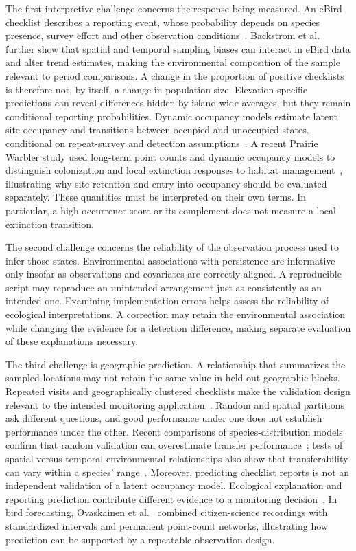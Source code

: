 The first interpretive challenge concerns the response being measured. An eBird checklist describes a reporting event, whose probability depends on species presence, survey effort and other observation conditions~\cite{sullivan2009,johnston2021}. Backstrom et al.~\cite{backstrom2025} further show that spatial and temporal sampling biases can interact in eBird data and alter trend estimates, making the environmental composition of the sample relevant to period comparisons. A change in the proportion of positive checklists is therefore not, by itself, a change in population size. Elevation-specific predictions can reveal differences hidden by island-wide averages, but they remain conditional reporting probabilities. Dynamic occupancy models estimate latent site occupancy and transitions between occupied and unoccupied states, conditional on repeat-survey and detection assumptions~\cite{mackenzie2002,mackenzie2003,guillera2017}. A recent Prairie Warbler study used long-term point counts and dynamic occupancy models to distinguish colonization and local extinction responses to habitat management~\cite{gordon2024}, illustrating why site retention and entry into occupancy should be evaluated separately. These quantities must be interpreted on their own terms. In particular, a high occurrence score or its complement does not measure a local extinction transition.

The second challenge concerns the reliability of the observation process used to infer those states. Environmental associations with persistence are informative only insofar as observations and covariates are correctly aligned. A reproducible script may reproduce an unintended arrangement just as consistently as an intended one. Examining implementation errors helps assess the reliability of ecological interpretations. A correction may retain the environmental association while changing the evidence for a detection difference, making separate evaluation of these explanations necessary.

The third challenge is geographic prediction. A relationship that summarizes the sampled locations may not retain the same value in held-out geographic blocks. Repeated visits and geographically clustered checklists make the validation design relevant to the intended monitoring application~\cite{roberts2017,valavi2019,ploton2020}. Random and spatial partitions ask different questions, and good performance under one does not establish performance under the other. Recent comparisons of species-distribution models confirm that random validation can overestimate transfer performance~\cite{spacetime2025}; tests of spatial versus temporal environmental relationships also show that transferability can vary within a species' range~\cite{lovell2025}. Moreover, predicting checklist reports is not an independent validation of a latent occupancy model. Ecological explanation and reporting prediction contribute different evidence to a monitoring decision~\cite{elith2009}. In bird forecasting, Ovaskainen et al.~\cite{ovaskainen2026} combined citizen-science recordings with standardized intervals and permanent point-count networks, illustrating how prediction can be supported by a repeatable observation design.

